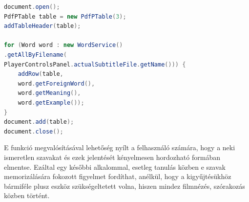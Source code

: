 \begin{spacing}{1.25}
\begin{lstlisting}[caption=PDF fájl megalkotása, language=java, label={lst:pdf}]
document.open();
PdfPTable table = new PdfPTable(3);
addTableHeader(table);

for (Word word : new WordService()
.getAllByFilename(
PlayerControlsPanel.actualSubtitleFile.getName())) {
    addRow(table,
    word.getForeignWord(),
    word.getMeaning(),
    word.getExample());
}
document.add(table);
document.close();
\end{lstlisting}
\end{spacing}

E funkció megvalósításával lehetőség nyílt a felhasználó számára, hogy a neki ismeretlen szavakat és ezek jelentését kényelmesen hordozható formában elmentse. Ezáltal egy későbbi alkalommal, esetleg tanulás közben e szavak memorizálására fokozott figyelmet fordíthat, anélkül, hogy a kigyűjtésükhöz bármiféle plusz eszköz szükségeltetett volna, hiszen mindez filmnézés, szórakozás közben történt.